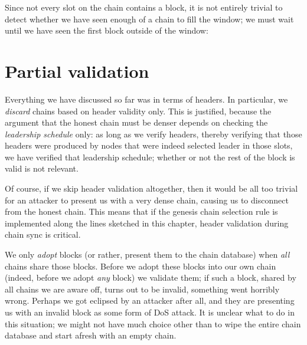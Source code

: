 Since not every slot on the chain contains a block, it is not entirely trivial
to detect whether we have seen enough of a chain to fill the window; we must
wait until we have seen the first block outside of the window:
%
\begin{center}
\end{center}

\section{Partial validation}

Everything we have discussed so far was in terms of headers. In particular,
we \emph{discard} chains based on header validity only. This is justified,
because the argument that the honest chain must be denser depends on checking
the \emph{leadership schedule} only: as long as we verify headers, thereby
verifying that those headers were produced by nodes that were indeed selected
leader in those slots, we have verified that leadership schedule; whether or
not the rest of the block is valid is not relevant.

Of course, if we skip header validation altogether, then it would be all too
trivial for an attacker to present us with a very dense chain, causing us to
disconnect from the honest chain. This means that if  the genesis chain
selection rule is implemented along the lines sketched in this chapter, header
validation during chain sync is critical.

We only \emph{adopt} blocks (or rather, present them to the chain database) when
\emph{all} chains share those blocks. Before we adopt these blocks into our own
chain (indeed, before we adopt \emph{any} block) we validate them; if such a
block, shared by all chains we are aware off, turns out to be invalid, something
went horribly wrong. Perhaps we got eclipsed by an attacker after all, and they
are presenting us with an invalid block as some form of DoS attack. It is
unclear what to do in this situation; we might not have much choice other than
to wipe the entire chain database and start afresh with an empty chain.

